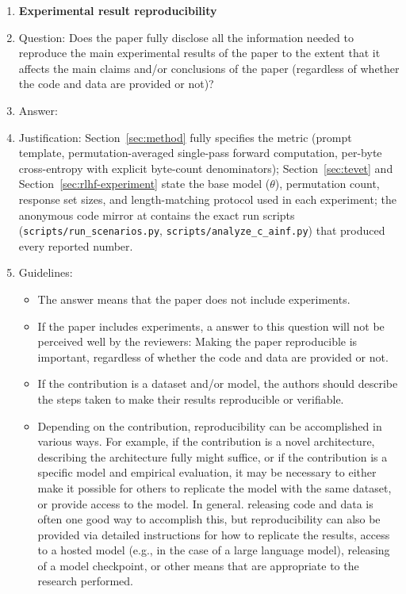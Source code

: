 \begin{enumerate}
    \item {\bf Experimental result reproducibility}
    \item[] Question: Does the paper fully disclose all the information needed to reproduce the main experimental results of the paper to the extent that it affects the main claims and/or conclusions of the paper (regardless of whether the code and data are provided or not)?
    \item[] Answer: \answerYes{}
    \item[] Justification: Section~\ref{sec:method} fully specifies the metric (prompt template, permutation-averaged single-pass forward computation, per-byte cross-entropy with explicit byte-count denominators); Section~\ref{sec:tevet} and Section~\ref{sec:rlhf-experiment} state the base model ($\theta$), permutation count, response set sizes, and length-matching protocol used in each experiment; the anonymous code mirror at \projectGithubUrl{} contains the exact run scripts (\texttt{scripts/run\_scenarios.py}, \texttt{scripts/analyze\_c\_ainf.py}) that produced every reported number.
    \item[] Guidelines:
    \begin{itemize}
        \item The answer \answerNA{} means that the paper does not include experiments.
        \item If the paper includes experiments, a \answerNo{} answer to this question will not be perceived well by the reviewers: Making the paper reproducible is important, regardless of whether the code and data are provided or not.
        \item If the contribution is a dataset and\slash or model, the authors should describe the steps taken to make their results reproducible or verifiable.
        \item Depending on the contribution, reproducibility can be accomplished in various ways. For example, if the contribution is a novel architecture, describing the architecture fully might suffice, or if the contribution is a specific model and empirical evaluation, it may be necessary to either make it possible for others to replicate the model with the same dataset, or provide access to the model. In general. releasing code and data is often one good way to accomplish this, but reproducibility can also be provided via detailed instructions for how to replicate the results, access to a hosted model (e.g., in the case of a large language model), releasing of a model checkpoint, or other means that are appropriate to the research performed.

\end{itemize}
\end{enumerate}
